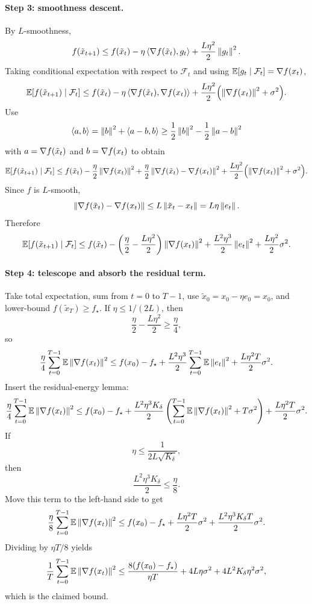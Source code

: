 \paragraph{Step 3: smoothness descent.}
By $L$-smoothness,
\[
f(\tilde x_{t+1})
\le
f(\tilde x_t)
-\eta \left\langle \nabla f(\tilde x_t), g_t \right\rangle
+
\frac{L\eta^2}{2}\left\lVert g_t \right\rVert^2.
\]
Taking conditional expectation with respect to $\mathcal F_t$ and using
$\mathbb{E}[g_t\mid\mathcal F_t]=\nabla f(x_t)$,
\[
\mathbb{E}\!\left[f(\tilde x_{t+1})\mid\mathcal F_t\right]
\le
f(\tilde x_t)
-\eta \left\langle \nabla f(\tilde x_t), \nabla f(x_t) \right\rangle
+
\frac{L\eta^2}{2}\Bigl(\left\lVert \nabla f(x_t) \right\rVert^2+\sigma^2\Bigr).
\]
Use
\[
\left\langle a, b \right\rangle
=
\left\lVert b \right\rVert^2+\left\langle a-b, b \right\rangle
\ge
\frac12\left\lVert b \right\rVert^2-\frac12\left\lVert a-b \right\rVert^2
\]
with $a=\nabla f(\tilde x_t)$ and $b=\nabla f(x_t)$ to obtain
\[
\mathbb{E}\!\left[f(\tilde x_{t+1})\mid\mathcal F_t\right]
\le
f(\tilde x_t)
-\frac{\eta}{2}\left\lVert \nabla f(x_t) \right\rVert^2
+
\frac{\eta}{2}\left\lVert \nabla f(\tilde x_t)-\nabla f(x_t) \right\rVert^2
+
\frac{L\eta^2}{2}\Bigl(\left\lVert \nabla f(x_t) \right\rVert^2+\sigma^2\Bigr).
\]
Since $f$ is $L$-smooth,
\[
\left\lVert \nabla f(\tilde x_t)-\nabla f(x_t) \right\rVert
\le
L\left\lVert \tilde x_t-x_t \right\rVert
=
L\eta \left\lVert e_t \right\rVert.
\]
Therefore
\[
\mathbb{E}\!\left[f(\tilde x_{t+1})\mid\mathcal F_t\right]
\le
f(\tilde x_t)
-\left(\frac{\eta}{2}-\frac{L\eta^2}{2}\right)\left\lVert \nabla f(x_t) \right\rVert^2
+
\frac{L^2\eta^3}{2}\left\lVert e_t \right\rVert^2
+
\frac{L\eta^2}{2}\sigma^2.
\]

\paragraph{Step 4: telescope and absorb the residual term.}
Take total expectation, sum from $t=0$ to $T-1$, use
$\tilde x_0=x_0-\eta e_0=x_0$, and lower-bound
$f(\tilde x_T)\ge f_\star$. If $\eta\le 1/(2L)$, then
\[
\frac{\eta}{2}-\frac{L\eta^2}{2}\ge \frac{\eta}{4},
\]
so
\[
\frac{\eta}{4}\sum_{t=0}^{T-1}\mathbb{E}\left\lVert \nabla f(x_t) \right\rVert^2
\le
f(x_0)-f_\star
+
\frac{L^2\eta^3}{2}\sum_{t=0}^{T-1}\mathbb{E}\left\lVert e_t \right\rVert^2
+
\frac{L\eta^2T}{2}\sigma^2.
\]
Insert the residual-energy lemma:
\[
\frac{\eta}{4}\sum_{t=0}^{T-1}\mathbb{E}\left\lVert \nabla f(x_t) \right\rVert^2
\le
f(x_0)-f_\star
+
\frac{L^2\eta^3K_\delta}{2}
\left(
\sum_{t=0}^{T-1}\mathbb{E}\left\lVert \nabla f(x_t) \right\rVert^2
+
T\sigma^2
\right)
+
\frac{L\eta^2T}{2}\sigma^2.
\]
If
\[
\eta\le \frac{1}{2L\sqrt{K_\delta}},
\]
then
\[
\frac{L^2\eta^3K_\delta}{2}\le \frac{\eta}{8}.
\]
Move this term to the left-hand side to get
\[
\frac{\eta}{8}\sum_{t=0}^{T-1}\mathbb{E}\left\lVert \nabla f(x_t) \right\rVert^2
\le
f(x_0)-f_\star
+
\frac{L\eta^2T}{2}\sigma^2
+
\frac{L^2\eta^3K_\delta T}{2}\sigma^2.
\]
Dividing by $\eta T/8$ yields
\[
\frac{1}{T}\sum_{t=0}^{T-1}\mathbb{E}\left\lVert \nabla f(x_t) \right\rVert^2
\le
\frac{8(f(x_0)-f_\star)}{\eta T}
+
4L\eta\sigma^2
+
4L^2K_\delta \eta^2\sigma^2,
\]
which is the claimed bound.

